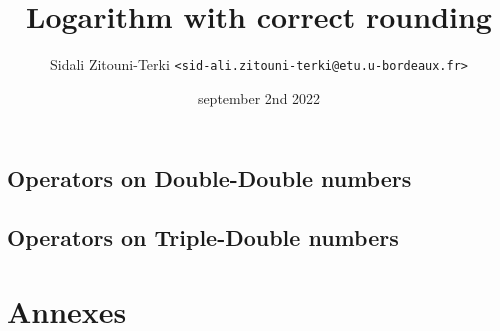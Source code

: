 \documentclass[12pt,a4paper]{memoir}
\title{Logarithm with correct rounding}
\author{Sidali Zitouni-Terki \texttt{<sid-ali.zitouni-terki@etu.u-bordeaux.fr>}}
\date{september 2nd 2022}
\begin{document}
\maketitle




\tableofcontents
\newpage







\chapter{Operators on Double-Double numbers}











\chapter{Operators on Triple-Double numbers}











%

\part*{Annexes}
\appendix



\nocite{*}


\end{document}
